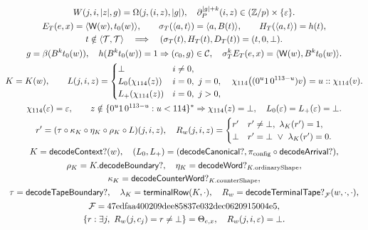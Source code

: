 \begin{gather}
 W(j,i,|z|,g)=\Omega(j,(i,z),|g|),\quad
 \partial_P^{|g|+k}(i,z)\in(\mathbb Z/p)\times\{\eps\}.\label{sym:windnum}\\
\begin{gathered}
E_T(e,x)=\pair{\wt(w)}{t_0(w)},\qquad
\sigma_T(\pair a t)=\pair a{B(t)},\qquad
H_T(\pair a t)=h(t),\\
t\notin\pair{\T}{\T}\quad\Longrightarrow\quad
(\sigma_T(t),H_T(t),D_T(t))=(t,0,\bot).
\end{gathered}\\
g=\beta(B^k t_0(w)),\quad h(B^k t_0(w))=1
 \Rightarrow (c_0,g)\in\mathcal C,\quad
 \sigma_T^k E_T(e,x)=\pair{\wt(w)}{B^k t_0(w)}.\label{sym:physnum}\\
K=K(w),\qquad
 L(j,i,z)=\begin{cases}
 \bot&i\ne0,\\
 L_0(\chi_{114}(z))&i=0,\ j=0,\\
 L_+(\chi_{114}(z))&i=0,\ j>0 ,
 \end{cases}\quad
 \chi_{114}\big((0^u1\,0^{113-u})v\big)=u::\chi_{114}(v).\\
\chi_{114}(\eps)=\eps,\qquad
 z\notin\{0^u1\,0^{113-u}:u<114\}^*\Rightarrow\chi_{114}(z)=\bot,\quad
 L_0(\eps)=L_+(\eps)=\bot.\\
 r'=(\tau\circ\kappa_K\circ\eta_K\circ\rho_K\circ L)(j,i,z),\quad
 R_w(j,i,z)=
 \begin{cases}r'&r'\ne\bot,\ \lambda_K(r')=1,\\ \bot&r'=\bot\ \lor\ \lambda_K(r')=0.\end{cases}\\
 K=\mathsf{decodeContext?}(w),\quad (L_0,L_+)=(\mathsf{decodeCanonical?},\pi_{\rm config}\circ\mathsf{decodeArrival?}),\\
 \begin{gathered}
\rho_K=K.\mathsf{decodeBoundary?},\quad
 \eta_K=\mathsf{decodeWord?}_{K.\mathrm{ordinaryShape}},\\
\kappa_K=\mathsf{decodeCounterWord?}_{K.\mathrm{counterShape}},
\end{gathered}\\
 \tau=\mathsf{decodeTapeBoundary?},\quad\lambda_K=\mathsf{terminalRow}(K,\cdot),\quad
 R_w=\mathsf{decodeTerminalTape?}_{\mathcal F}(w,\cdot,\cdot),\\
\begin{gathered}
\mathcal F=\mathrm{47edfaa400209dee85837e032dec0620915004e5},\\
\{r:\exists j,\ R_w(j,c_j)=r\ne\bot\}=\Theta_{e,x},\quad R_w(j,i,\eps)=\bot.
\end{gathered}\label{sym:refnum}\\

\end{gather}
